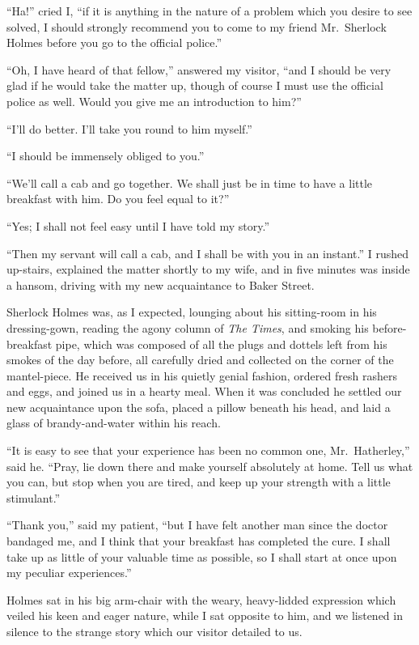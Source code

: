 “Ha!” cried I, “if it is anything in the nature of a problem
which you desire to see solved, I should strongly recommend
you to come to my friend Mr.~Sherlock Holmes before
you go to the official police.”

“Oh, I have heard of that fellow,” answered my visitor,
“and I should be very glad if he would take the matter up,
though of course I must use the official police as well. Would
you give me an introduction to him?”

“I’ll do better. I’ll take you round to him myself.”

“I should be immensely obliged to you.”

“We’ll call a cab and go together. We shall just be in time
to have a little breakfast with him. Do you feel equal to it?”

“Yes; I shall not feel easy until I have told my story.”

“Then my servant will call a cab, and I shall be with you
in an instant.” I rushed up-stairs, explained the matter shortly
to my wife, and in five minutes was inside a hansom, driving
with my new acquaintance to Baker Street.

Sherlock Holmes was, as I expected, lounging about his
sitting-room in his dressing-gown, reading the agony column
of \textit{The Times}, and smoking his before-breakfast pipe, which
was composed of all the plugs and dottels left from his smokes
of the day before, all carefully dried and collected on the corner
of the mantel-piece. He received us in his quietly genial
fashion, ordered fresh rashers and eggs, and joined us in a
hearty meal. When it was concluded he settled our new acquaintance
upon the sofa, placed a pillow beneath his head,
and laid a glass of brandy-and-water within his reach.

“It is easy to see that your experience has been no common
one, Mr.~Hatherley,” said he. “Pray, lie down there
and make yourself absolutely at home. Tell us what you can,
but stop when you are tired, and keep up your strength with
a little stimulant.”

“Thank you,” said my patient, “but I have felt another
man since the doctor bandaged me, and I think that your
breakfast has completed the cure. I shall take up as little of
your valuable time as possible, so I shall start at once upon
my peculiar experiences.”

Holmes sat in his big arm-chair with the weary, heavy-lidded
expression which veiled his keen and eager nature, while
I sat opposite to him, and we listened in silence to the strange
story which our visitor detailed to us.

